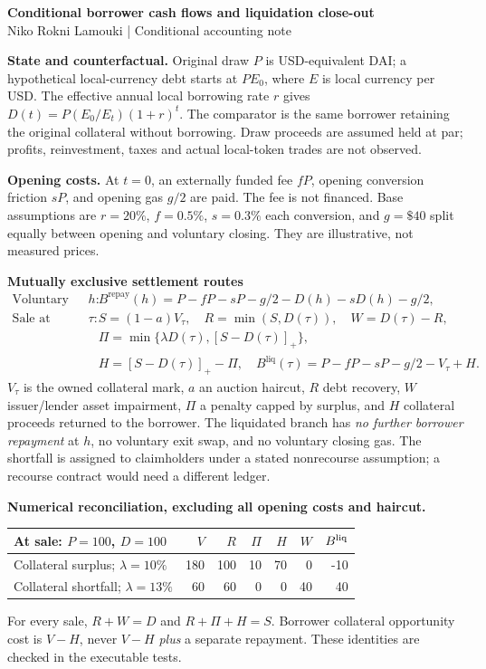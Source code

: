\documentclass[10pt,a4paper]{article}
\begin{document}
\begin{center}
{\Large \bfseries Conditional borrower cash flows and liquidation close-out}\\[2mm]
{\small Niko Rokni Lamouki \quad | \quad Conditional accounting note}
\end{center}
\vspace{1mm}
\noindent\textbf{State and counterfactual.} Original draw $P$ is USD-equivalent DAI; a hypothetical local-currency debt starts at $PE_0$, where $E$ is local currency per USD. The effective annual local borrowing rate $r$ gives $D(t)=P(E_0/E_t)(1+r)^t$. The comparator is the same borrower retaining the original collateral without borrowing. Draw proceeds are assumed held at par; profits, reinvestment, taxes and actual local-token trades are not observed.

\medskip
\noindent\textbf{Opening costs.} At $t=0$, an externally funded fee $fP$, opening conversion friction $sP$, and opening gas $g/2$ are paid. The fee is not financed. Base assumptions are $r=20\%$, $f=0.5\%$, $s=0.3\%$ each conversion, and $g=\$40$ split equally between opening and voluntary closing. They are illustrative, not measured prices.

\medskip
\noindent\textbf{Mutually exclusive settlement routes}
\[
\begin{array}{ll}
\text{Voluntary full repayment at }h:&
 B^{\mathrm{repay}}(h)=P-fP-sP-g/2-D(h)-sD(h)-g/2,\\[2pt]
\text{Sale at liquidation time }\tau:&
 S=(1-a)V_\tau,\quad R=\min(S,D(\tau)),\quad W=D(\tau)-R,\\
&
 \Pi=\min\{\lambda D(\tau),[S-D(\tau)]_+\},\\
&
 H=[S-D(\tau)]_+-\Pi,\quad
 B^{\mathrm{liq}}(\tau)=P-fP-sP-g/2-V_\tau+H.
\end{array}
\]
\noindent $V_\tau$ is the owned collateral mark, $a$ an auction haircut, $R$ debt recovery, $W$ issuer/lender asset impairment, $\Pi$ a penalty capped by surplus, and $H$ collateral proceeds returned to the borrower. The liquidated branch has \emph{no further borrower repayment} at $h$, no voluntary exit swap, and no voluntary closing gas. The shortfall is assigned to claimholders under a stated nonrecourse assumption; a recourse contract would need a different ledger.

\medskip
\noindent\textbf{Numerical reconciliation, excluding all opening costs and haircut.}
\begin{center}
\begin{tabular}{lrrrrrr}
\toprule
At sale: $P=100$, $D=100$ & $V$ & $R$ & $\Pi$ & $H$ & $W$ & $B^{\rm liq}$\\
\midrule
Collateral surplus; $\lambda=10\%$ & 180 & 100 & 10 & 70 & 0 & -10\\
Collateral shortfall; $\lambda=13\%$ & 60 & 60 & 0 & 0 & 40 & 40\\
\bottomrule
\end{tabular}
\end{center}
\noindent For every sale, $R+W=D$ and $R+\Pi+H=S$. Borrower collateral opportunity cost is $V-H$, never $V-H$ \emph{plus} a separate repayment. These identities are checked in the executable tests.
\end{document}
